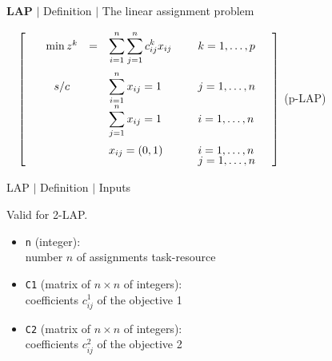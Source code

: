 %
% 
\begin{frame}{\textbf{LAP} $\mid$ Definition $\mid$ The linear assignment problem}

    
    \begin{center}
$
\quad
\left [
\begin{array}{lcllllll}

\ &  \min z^k & =  & \displaystyle{\sum_{i=1}^{n}\sum_{j=1}^{n} c^k_{ij} x_{ij}}  & & k=1,\dots,p\vspace{2mm} \\

 & s/c  & &   \displaystyle{\sum_{i=1}^{n}  x_{ij}}   =  1 & \ &  j=1,\dots ,n \  \ \  \\
  &       & &   \displaystyle{\sum_{j=1}^{n}  x_{ij}}   =  1 & & i=1,\dots ,n \    \vspace{2mm} \\

 & & &  x_{ij} = (0,1) &&   i=1,\dots ,n  \vspace{-1mm}\\
 & & &   & & j=1,\dots ,n\\ 
 
\end{array}
\right ]
$ \hfill (p-LAP)
\end{center}
\end{frame}

%
% 
\begin{frame}{LAP $\mid$ Definition $\mid$ Inputs}

Valid for 2-LAP.
\bigskip

              \begin{itemize}
                \item \texttt{n} (integer): \\ number $n$ of assignments task-resource 
                           \medskip
                \item \texttt{C1} (matrix of $n \times n$ of integers): \\  coefficients $c^1_{ij}$ of the objective 1  
                           \medskip
                \item \texttt{C2} (matrix of $n \times n$ of integers): \\  coefficients $c^2_{ij}$ of the objective 2                                         
              \end{itemize}
\end{frame}


